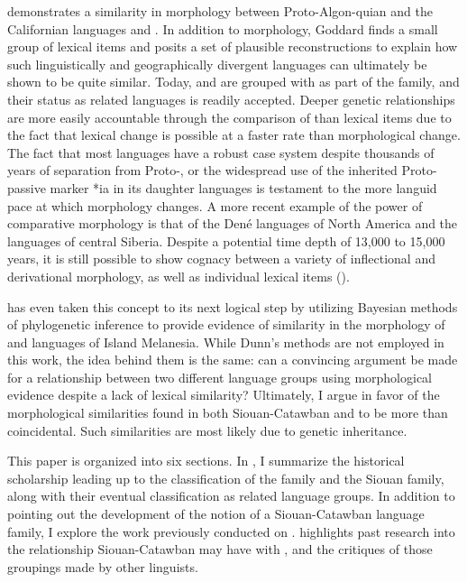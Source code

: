 \documentclass[output=paper]{LSP/langsci}
\begin{document}
\citet{Goddard1975} demonstrates a similarity in morphology between Proto-Algon-quian and the Californian languages  and . In addition to morphology, Goddard finds a small group of lexical items and posits a set of plausible reconstructions to explain how such linguistically and geographically divergent languages can ultimately be shown to be quite similar. Today,  and  are grouped with  as part of the  family, and their status as related languages is readily accepted. Deeper genetic relationships are more easily accountable through the comparison of  than lexical items due to the fact that lexical change is possible at a faster rate than morphological change. The fact that most  languages have a robust case system despite thousands of years of separation from Proto-, or the widespread use of the inherited Proto- passive marker *ia in its daughter languages is testament to the more languid pace at which morphology changes. A more recent example of the power of comparative morphology is that of the Dené languages of North America and the  languages of central Siberia. Despite a potential time depth of 13,000 to 15,000 years, it is still possible to show cognacy between a variety of inflectional and derivational morphology, as well as individual lexical items (\citealt{Vajda2010}).

\citet{Dunn2009} has even taken this concept to its next logical step by utilizing Bayesian methods of phylogenetic inference to provide evidence of similarity in the morphology of  and  languages of Island Melanesia. While Dunn's methods are not employed in this work, the idea behind them is the same: can a convincing argument be made for a relationship between two different language groups using morphological evidence despite a lack of lexical similarity? Ultimately, I argue in favor of the morphological similarities found in both Siouan-Catawban and  to be more than coincidental. Such similarities are most likely due to genetic inheritance.

This paper is organized into six sections. In , I summarize the historical scholarship leading up to the classification of the  family and the Siouan family, along with their eventual classification as related language groups. In addition to pointing out the development of the notion of a Siouan-Catawban language family, I explore the work previously conducted on .  highlights past research into the relationship Siouan-Catawban may have with , and the critiques of those groupings made by other linguists. 
\end{document}

